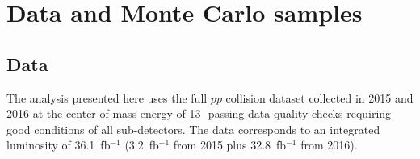 \section{Data and Monte Carlo samples}
\label{sec:datasamples}
\subsection{Data}
The analysis presented here uses the full $pp$ collision dataset
collected in 2015 and 2016 
at the center-of-mass energy of 13\,\TeV\, passing data quality
checks requiring good conditions of all sub-detectors.
The data corresponds to an integrated
luminosity of 36.1~fb$^{-1}$ (3.2~fb$^{-1}$ from 2015 plus
32.8~fb$^{-1}$ from 2016).%

